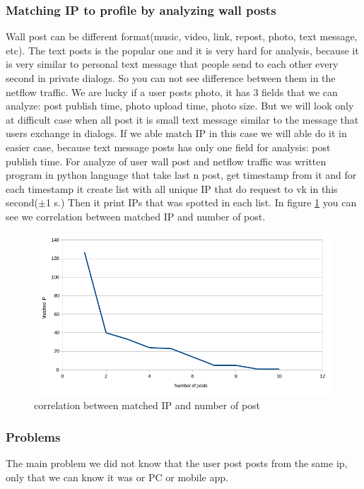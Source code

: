 \subsubsection{Matching IP to profile by analyzing wall posts}
Wall post can be different format(music, video, link, repost, photo, text message, etc). The text posts is the popular one and it is very hard for analysis, because it is very similar to personal text message that people send to each other every second in private dialogs. So you can not see difference between them in the netflow traffic. We are lucky if a user posts photo, it has 3 fields that we can analyze: post publish time, photo upload time, photo size. But we will look only at difficult case when all post it is small text message similar to the message that users exchange in dialogs. If we able match IP in this case we will able do it in easier case, because text message posts has only one field for analysis: post publish time. For analyze of user wall post and netflow traffic was written program in python language that take last n post, get timestamp from it and for each timestamp it create list with all unique IP that do request to vk in this second($\pm$1 s.) Then it print IPs that was spotted in each list. In figure \ref{fig:wall} you can see we correlation between matched IP and number of post. 
 
\begin{figure}[H]%
	\centering
		\includegraphics[width=180mm]{images/vk/wall.png}
	\caption{correlation between matched IP and number of post}
	\label{fig:wall}
\end{figure}

\subsubsection{Problems}
The main problem we did not know that the user post posts from the same ip, only that we can know it was or PC or mobile app. 

